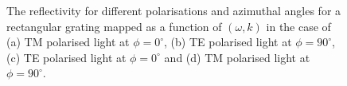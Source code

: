 \begin{figure}
\begin{center}
\end{center}
\caption[Reflectivity for different polarisations and azimuthal angles for a rectangular grating mapped as a function of $(\omega,k)$.]{The reflectivity for different polarisations and azimuthal angles for a rectangular grating mapped as a function of $(\omega,k)$ in the case of (a) TM polarised light at $\phi=0^\circ$, (b) TE polarised light at $\phi=90^\circ$, (c) TE polarised light at $\phi=0^\circ$ and (d) TM polarised light at $\phi=90^\circ$.\label{fig:rectDispersion}}
\end{figure}

